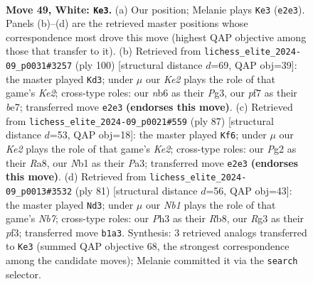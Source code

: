 \documentclass[11pt]{article}
\begin{document}
\clearpage

\begin{figure}[p]\centering
\begin{subfigure}{0.46\textwidth}\centering
\resizebox{\linewidth}{!}{%
\newchessgame
\chessboard[
  setfen={6k1/5p1p/1n4p1/p3p1P1/P3P3/1P4RP/4K1P1/RNrr4 w - - 12 49},
  showmover=false,
  pgfstyle=straightmove, color=movearrow, markmove={e2-e3}
]}
\caption{}
\end{subfigure}\hfill
\begin{subfigure}{0.46\textwidth}\centering
\resizebox{\linewidth}{!}{%
\newchessgame
\chessboard[
  setfen={8/2r1bk1p/1p2p1p1/1P2p3/2r4P/2N1P1P1/1RR1KP2/8 w - - 1 51},
  showmover=false,
  pgfstyle=straightmove, color=movearrow, markmove={e2-d3}
]}
\caption{}
\end{subfigure}
\\[4pt]
\begin{subfigure}{0.46\textwidth}\centering
\resizebox{\linewidth}{!}{%
\newchessgame
\chessboard[
  setfen={r7/4kpp1/r3p2p/3p3P/3P2P1/p3P3/R4PK1/R7 b - - 0 44},
  showmover=false,
  pgfstyle=straightmove, color=movearrow, markmove={e7-f6}
]}
\caption{}
\end{subfigure}\hfill
\begin{subfigure}{0.46\textwidth}\centering
\resizebox{\linewidth}{!}{%
\newchessgame
\chessboard[
  setfen={1r6/4k3/4p2p/6p1/1rp1N3/p3PP2/Pn2K1P1/1RR5 b - - 1 41},
  showmover=false,
  pgfstyle=straightmove, color=movearrow, markmove={b2-d3}
]}
\caption{}
\end{subfigure}
\caption{\textbf{Move 49, White: \texttt{Ke3}.} (a) Our position; Melanie plays \texttt{Ke3} (\texttt{e2e3}). Panels (b)--(d) are the retrieved master positions whose correspondence most drove this move (highest QAP objective among those that transfer to it). (b) Retrieved from \texttt{lichess\_elite\_2024-09\_p0031\#3257} (ply 100) [structural distance $d$=69, QAP obj=39]: the master played \texttt{Kd3}; under $\mu$ our \emph{Ke2} plays the role of that game's \emph{Ke2}; cross-type roles: our \emph{n}b6 as their \emph{P}g3, our \emph{p}f7 as their \emph{b}e7; transferred move \texttt{e2e3} \textbf{(endorses this move)}. (c) Retrieved from \texttt{lichess\_elite\_2024-09\_p0021\#559} (ply 87) [structural distance $d$=53, QAP obj=18]: the master played \texttt{Kf6}; under $\mu$ our \emph{Ke2} plays the role of that game's \emph{Ke2}; cross-type roles: our \emph{P}g2 as their \emph{R}a8, our \emph{N}b1 as their \emph{P}a3; transferred move \texttt{e2e3} \textbf{(endorses this move)}. (d) Retrieved from \texttt{lichess\_elite\_2024-09\_p0013\#3532} (ply 81) [structural distance $d$=56, QAP obj=43]: the master played \texttt{Nd3}; under $\mu$ our \emph{Nb1} plays the role of that game's \emph{Nb7}; cross-type roles: our \emph{P}h3 as their \emph{R}b8, our \emph{R}g3 as their \emph{p}f3; transferred move \texttt{b1a3}. Synthesis: 3 retrieved analogs transferred to \texttt{Ke3} (summed QAP objective 68, the strongest correspondence among the candidate moves); Melanie committed it via the \texttt{search} selector.}
\label{fig:thought-m96}
\end{figure}
\end{document}
